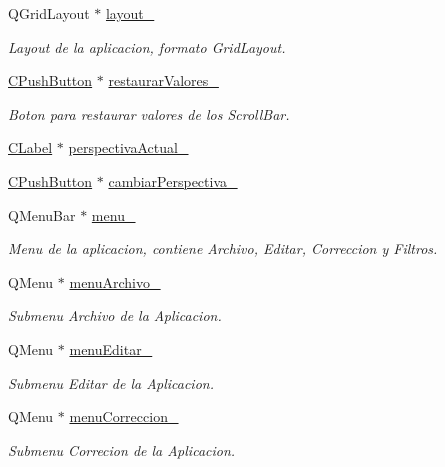 \begin{DoxyCompactItemize}
Q\+Grid\+Layout $\ast$ \hyperlink{classCAplicacion_a135b700bb291de086b00bcc4481ffc8b}{layout\+\_\+}
\begin{DoxyCompactList}\small\item\em Layout de la aplicacion, formato Grid\+Layout. \end{DoxyCompactList}\item 
\hyperlink{classCPushButton}{C\+Push\+Button} $\ast$ \hyperlink{classCAplicacion_acfcf9adb74829feabd09e7a8d495c622}{restaurar\+Valores\+\_\+}
\begin{DoxyCompactList}\small\item\em Boton para restaurar valores de los Scroll\+Bar. \end{DoxyCompactList}\item 
\hyperlink{classCLabel}{C\+Label} $\ast$ \hyperlink{classCAplicacion_af4d7a5ca89ed12613305daad3c0e3ffe}{perspectiva\+Actual\+\_\+}
\item 
\hyperlink{classCPushButton}{C\+Push\+Button} $\ast$ \hyperlink{classCAplicacion_ace77f6e1f8cad42ec579cb8071935ed2}{cambiar\+Perspectiva\+\_\+}
\item 
Q\+Menu\+Bar $\ast$ \hyperlink{classCAplicacion_af1ac43fa5f82c2512f211fc0dbb00a3a}{menu\+\_\+}
\begin{DoxyCompactList}\small\item\em Menu de la aplicacion, contiene Archivo, Editar, Correccion y Filtros. \end{DoxyCompactList}\item 
Q\+Menu $\ast$ \hyperlink{classCAplicacion_abdf7a15d27725756e59d4408267d4688}{menu\+Archivo\+\_\+}
\begin{DoxyCompactList}\small\item\em Submenu Archivo de la Aplicacion. \end{DoxyCompactList}\item 
Q\+Menu $\ast$ \hyperlink{classCAplicacion_a9753ee6650d3a8922650b09b70fe15b9}{menu\+Editar\+\_\+}
\begin{DoxyCompactList}\small\item\em Submenu Editar de la Aplicacion. \end{DoxyCompactList}\item 
Q\+Menu $\ast$ \hyperlink{classCAplicacion_acb53cba72e72d1b6feb8203a4942b436}{menu\+Correccion\+\_\+}
\begin{DoxyCompactList}\small\item\em Submenu Correcion de la Aplicacion. \end{DoxyCompactList}\item 

\end{DoxyCompactItemize}
